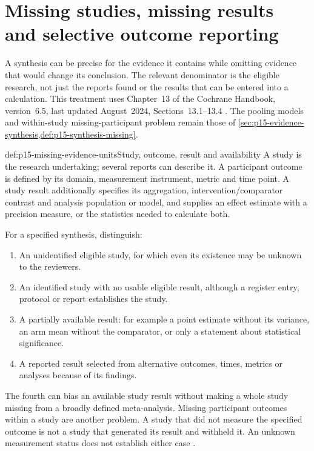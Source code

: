 \section{Missing studies, missing results and selective outcome reporting}
\label{sec:p15-missing-evidence}

A synthesis can be precise for the evidence it contains while omitting
evidence that would change its conclusion. The relevant denominator is
the eligible research, not just the reports found or the results that
can be entered into a calculation. This treatment uses Chapter~13 of
the Cochrane Handbook, version~6.5, last updated August~2024,
Sections~13.1--13.4 \cite{PageHigginsSterne2024Cochrane13}.
The pooling models and within-study missing-participant problem remain
those of \cref{sec:p15-evidence-synthesis,def:p15-synthesis-missing}.

\begin{hbdefinition}{def:p15-missing-evidence-units}{Study, outcome, result and availability}
A study is the research undertaking; several reports can describe it.
A participant outcome is defined by its domain, measurement instrument,
metric and time point. A study result additionally specifies its
aggregation, intervention/comparator contrast and analysis population
or model, and supplies an effect estimate with a precision measure,
or the statistics needed to calculate both.

For a specified synthesis, distinguish:
\begin{enumerate}
\item An unidentified eligible study, for which even its existence
      may be unknown to the reviewers.
\item An identified study with no usable eligible result, although
      a register entry, protocol or report establishes the study.
\item A partially available result: for example a point estimate
      without its variance, an arm mean without the comparator,
      or only a statement about statistical significance.
\item A reported result selected from alternative outcomes, times,
      metrics or analyses because of its findings.
\end{enumerate}
The fourth can bias an available study result without making a whole
study missing from a broadly defined meta-analysis. Missing participant
outcomes within a study are another problem. A study that did not
measure the specified outcome is not a study that generated its result
and withheld it. An unknown measurement status does not establish either
case \cite[secs.~13.1, 13.3.1.2--13.3.1.3]{PageHigginsSterne2024Cochrane13}.
\end{hbdefinition}

